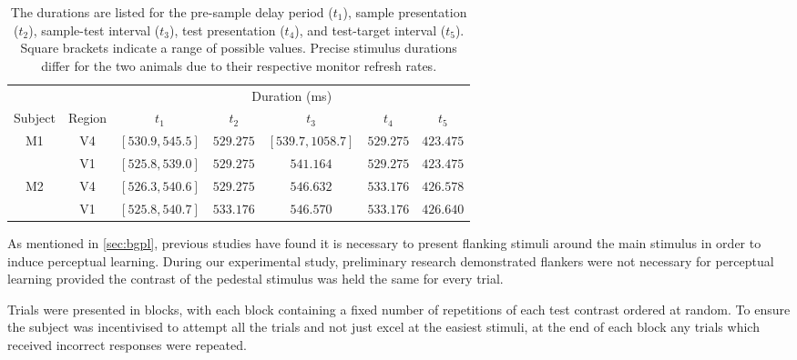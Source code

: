 \begin{table}[bthp]
{%
%
\begin{tabular}{ccccccc}
\toprule
         &          & \multicolumn{5}{c}{Duration (\si{\milli\second})} \\
\cmidrule(l){3-7}
Subject  & Region   & $t_1$            & $t_2$     & $t_3$             & $t_4$     & $t_5$     \\
\midrule
\acs{M1} & \acs{V4} & $[530.9, 545.5]$ & $529.275$ & $[539.7, 1058.7]$ & $529.275$ & $423.475$ \\
         & \acs{V1} & $[525.8, 539.0]$ & $529.275$ & $541.164$         & $529.275$ & $423.475$ \\
\acs{M2} & \acs{V4} & $[526.3, 540.6]$ & $529.275$ & $546.632$         & $533.176$ & $426.578$ \\
         & \acs{V1} & $[525.8, 540.7]$ & $533.176$ & $546.570$         & $533.176$ & $426.640$ \\
\bottomrule
%
\end{tabular}
} %
\caption{
The durations are listed for the
pre-sample delay period ($t_1$),
sample presentation ($t_2$),
sample-test interval ($t_3$),
test presentation ($t_4$), and
test-target interval ($t_5$).
Square brackets indicate a range of possible values.
Precise stimulus durations differ for the two animals due to their respective monitor refresh rates.
}
\label{tab:tptimes}
\end{table}


As mentioned in \autoref{sec:bgpl}, previous studies have found it is necessary to present flanking stimuli around the main stimulus in order to induce perceptual learning.
During our experimental study, preliminary research demonstrated flankers were not necessary for perceptual learning provided the contrast of the pedestal stimulus was held the same for every trial.

Trials were presented in blocks, with each block containing a fixed number of repetitions of each test contrast ordered at random.
To ensure the subject was incentivised to attempt all the trials and not just excel at the easiest stimuli, at the end of each block any trials which received incorrect responses were repeated.


